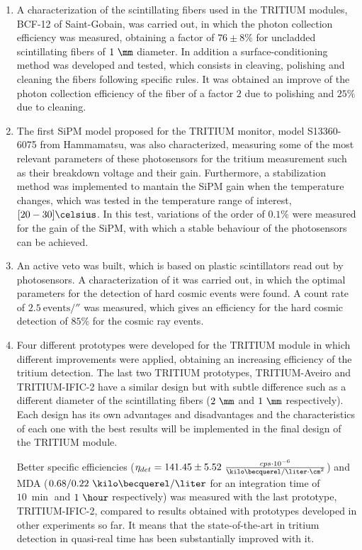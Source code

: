 \begin{enumerate}
\item{} A characterization of the scintillating fibers used in the TRITIUM modules, BCF-12 of Saint-Gobain, was carried out, in which the photon collection efficiency was measured, obtaining a factor of $76 \pm 8 \%$ for uncladded scintillating fibers of $1~\mm$ diameter. In addition a surface-conditioning method was developed and tested, which consists in cleaving, polishing and cleaning the fibers following specific rules. It was obtained an improve of the photon collection efficiency of the fiber of a factor $2$ due to polishing and $25\%$ due to cleaning.

\item{} The first SiPM model proposed for the TRITIUM monitor, model S13360-6075 from Hammamatsu, was also characterized, measuring some of the most relevant parameters of these photosensors for the tritium measurement such as their breakdown voltage and their gain. Furthermore, a stabilization method was implemented to mantain the SiPM gain when the temperature changes, which was tested in the temperature range of interest, $[20-30]\celsius$. In this test, variations of the order of $0.1\%$  were measured for the gain of the SiPM, with which a stable behaviour of the photosensors can be achieved.

\item{} An active veto was built, which is based on plastic scintillators read out by photosensors. A characterization of it was carried out, in which the optimal parameters for the detection of hard cosmic events were found. A count rate of $2.5~\text{events}/\second$ was measured, which gives an efficiency for the hard cosmic detection of $85\%$ for the cosmic ray events.

\item{} Four different prototypes were developed for the TRITIUM module in which different improvements were applied, obtaining an increasing efficiency of the tritium detection. The last two TRITIUM prototypes, TRITIUM-Aveiro and TRITIUM-IFIC-2 have a similar design but with subtle difference such as a different diameter of the scintillating fibers ($2~\mm$ and $1~\mm$ respectively). Each design has its own advantages and disadvantages and the characteristics of each one with the best results will be implemented in the final design of the TRITIUM module.

Better specific efficiencies ($\eta_{det} = 141.45\pm5.52~\frac{cps \cdot{} 10^{-6}}{\kilo\becquerel/ \liter \cdot{} \cm^2}$) and MDA ($0.68 /0.22~\kilo\becquerel / \liter$ for an integration time of $10~\min$ and $1~\hour$ respectively) was measured with the last prototype, TRITIUM-IFIC-2, compared to results obtained with prototypes developed in other experiments so far. It means that the state-of-the-art in tritium detection in quasi-real time has been substantially improved with it. 


\end{enumerate}
